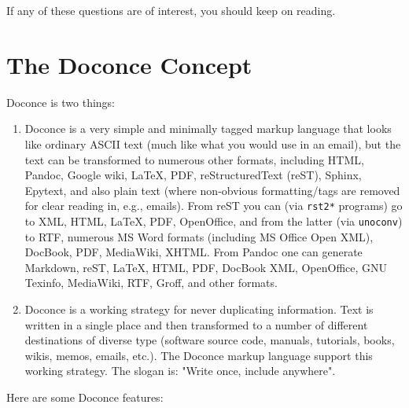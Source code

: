 \documentclass[twoside]{article}
\begin{document}
\noindent
If any of these questions are of interest, you should keep on reading.


\section{The Doconce Concept}

Doconce is two things:

\begin{enumerate}
 \item Doconce is a very simple and minimally tagged markup language that
    looks like ordinary ASCII text (much like what you would use in an
    email), but the text can be transformed to numerous other formats,
    including HTML, Pandoc, Google wiki, {\LaTeX}, PDF, reStructuredText
    (reST), Sphinx, Epytext, and also plain text (where non-obvious
    formatting/tags are removed for clear reading in, e.g.,
    emails). From reST you can (via {\fontsize{10pt}{10pt}\verb!rst2*!} programs) go to XML, HTML,
    {\LaTeX}, PDF, OpenOffice, and from the latter (via {\fontsize{10pt}{10pt}\verb!unoconv!}) to
    RTF, numerous MS Word formats (including MS Office Open XML),
    DocBook, PDF, MediaWiki, XHTML. From Pandoc one can generate
    Markdown, reST, {\LaTeX}, HTML, PDF, DocBook XML, OpenOffice, GNU
    Texinfo, MediaWiki, RTF, Groff, and other formats.

 \item Doconce is a working strategy for never duplicating information.
    Text is written in a single place and then transformed to
    a number of different destinations of diverse type (software
    source code, manuals, tutorials, books, wikis, memos, emails, etc.).
    The Doconce markup language support this working strategy.
    The slogan is: "Write once, include anywhere".
\end{enumerate}

\noindent
Here are some Doconce features:
\end{document}
